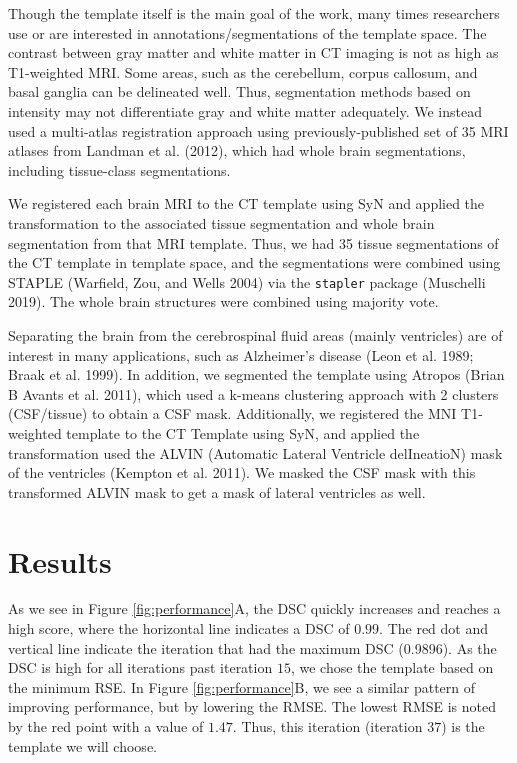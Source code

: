 \documentclass[]{elsarticle} %
\begin{document}
Though the template itself is the main goal of the work, many times researchers use or are interested in annotations/segmentations of the template space. The contrast between gray matter and white matter in CT imaging is not as high as T1-weighted MRI. Some areas, such as the cerebellum, corpus callosum, and basal ganglia can be delineated well. Thus, segmentation methods based on intensity may not differentiate gray and white matter adequately. We instead used a multi-atlas registration approach using previously-published set of 35 MRI atlases from Landman et al. (2012), which had whole brain segmentations, including tissue-class segmentations.

We registered each brain MRI to the CT template using SyN and applied the transformation to the associated tissue segmentation and whole brain segmentation from that MRI template. Thus, we had 35 tissue segmentations of the CT template in template space, and the segmentations were combined using STAPLE (Warfield, Zou, and Wells 2004) via the \texttt{stapler} package (Muschelli 2019). The whole brain structures were combined using majority vote.

Separating the brain from the cerebrospinal fluid areas (mainly ventricles) are of interest in many applications, such as Alzheimer's disease (Leon et al. 1989; Braak et al. 1999). In addition, we segmented the template using Atropos (Brian B Avants et al. 2011), which used a k-means clustering approach with 2 clusters (CSF/tissue) to obtain a CSF mask. Additionally, we registered the MNI T1-weighted template to the CT Template using SyN, and applied the transformation used the ALVIN (Automatic Lateral Ventricle delIneatioN) mask of the ventricles (Kempton et al. 2011). We masked the CSF mask with this transformed ALVIN mask to get a mask of lateral ventricles as well.

\hypertarget{results}{%
\section{Results}\label{results}}

As we see in Figure \ref{fig:performance}A, the DSC quickly increases and reaches a high score, where the horizontal line indicates a DSC of \(0.99\). The red dot and vertical line indicate the iteration that had the maximum DSC (0.9896). As the DSC is high for all iterations past iteration \(15\), we chose the template based on the minimum RSE. In Figure \ref{fig:performance}B, we see a similar pattern of improving performance, but by lowering the RMSE. The lowest RMSE is noted by the red point with a value of \(1.47\). Thus, this iteration (iteration \(37\)) is the template we will choose.
\end{document}
